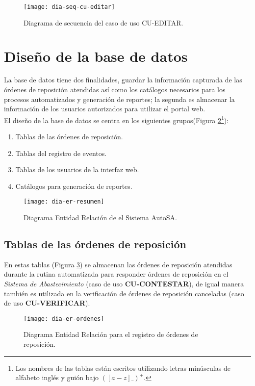 \begin{figure}[h]
	\centering
	\texttt{[image: dia-seq-cu-editar]}
	\caption{Diagrama de secuencia del caso de uso CU-EDITAR.}
	\label{fig:dia-seq-cu-editar}
\end{figure}



\section{Diseño de la base de datos}
La base de datos tiene dos finalidades, guardar la información capturada de las órdenes de reposición atendidas así como los catálogos necesarios para los procesos automatizados y generación de reportes; la segunda es almacenar la información de los usuarios autorizados para utilizar el portal web.\\
El diseño de la base de datos se centra en los siguientes grupos(Figura \ref{fig:dia-er-resumen}\footnote{Los nombres de las tablas están escritos utilizando letras minúsculas de alfabeto inglés y guión bajo $([a-z]{\_})^+$.}):
\begin{enumerate}
	\item Tablas de las órdenes de reposición.
	\item Tablas del registro de eventos.
	\item Tablas de los usuarios de la interfaz web.
	\item Catálogos para generación de reportes.
\end{enumerate}
\begin{figure}[h]
  \centering
  \texttt{[image: dia-er-resumen]}
  \caption{Diagrama Entidad Relación de el Sistema AutoSA.}
  \label{fig:dia-er-resumen}
\end{figure}

\pagebreak

\subsection{Tablas de las órdenes de reposición}
En estas tablas (Figura \ref{fig:dia-er-ordenes}) se almacenan las órdenes de reposición atendidas durante la rutina automatizada para responder órdenes de reposición en el \textit{Sistema de Abastecimiento} (caso de uso \textbf{CU-CONTESTAR}), de igual manera también es utilizada en la verificación de órdenes de reposición canceladas (caso de uso \textbf{CU-VERIFICAR}).
\begin{figure}[h]
  \centering
  \texttt{[image: dia-er-ordenes]} 
  \caption{Diagrama Entidad Relación para el registro de órdenes de reposición.}
  \label{fig:dia-er-ordenes}
\end{figure}
